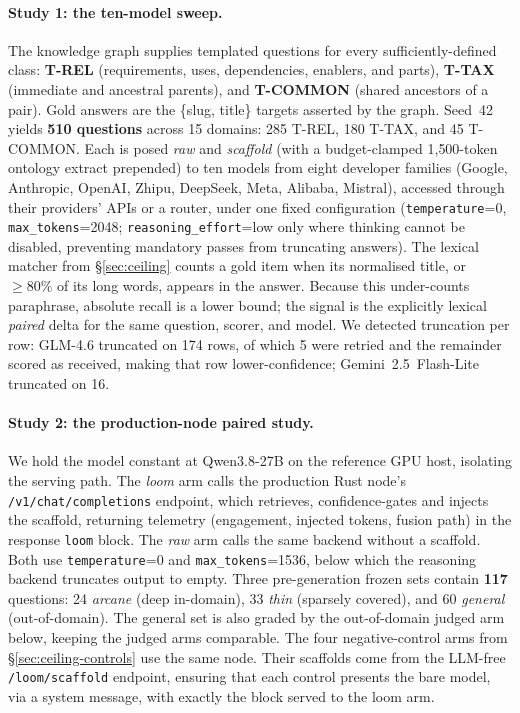 \documentclass[10pt,twocolumn]{article}
\begin{document}
\paragraph{Study 1: the ten-model sweep.} The knowledge graph supplies templated questions for every sufficiently-defined class: \textbf{T-REL} (requirements, uses, dependencies, enablers, and parts), \textbf{T-TAX} (immediate and ancestral parents), and \textbf{T-COMMON} (shared ancestors of a pair). Gold answers are the \{slug, title\} targets asserted by the graph. Seed~42 yields \textbf{510 questions} across 15 domains: 285 T-REL, 180 T-TAX, and 45 T-COMMON. Each is posed \emph{raw} and \emph{scaffold} (with a budget-clamped 1{,}500-token ontology extract prepended) to ten models from eight developer families (Google, Anthropic, OpenAI, Zhipu, DeepSeek, Meta, Alibaba, Mistral), accessed through their providers' APIs or a router, under one fixed configuration (\texttt{temperature}=0, \texttt{max\_tokens}=2048; \texttt{reasoning\_effort}=low only where thinking cannot be disabled, preventing mandatory passes from truncating answers). The lexical matcher from \S\ref{sec:ceiling} counts a gold item when its normalised title, or $\geq80\%$ of its long words, appears in the answer. Because this under-counts paraphrase, absolute recall is a lower bound; the signal is the explicitly lexical \emph{paired} delta for the same question, scorer, and model. We detected truncation per row: GLM-4.6 truncated on 174 rows, of which 5 were retried and the remainder scored as received, making that row lower-confidence; Gemini~2.5~Flash-Lite truncated on 16.

\paragraph{Study 2: the production-node paired study.} We hold the model constant at Qwen3.8-27B on the reference GPU host, isolating the serving path. The \emph{loom} arm calls the production Rust node's \texttt{/v1/chat/completions} endpoint, which retrieves, confidence-gates and injects the scaffold, returning telemetry (engagement, injected tokens, fusion path) in the response \texttt{loom} block. The \emph{raw} arm calls the same backend without a scaffold. Both use \texttt{temperature}=0 and \texttt{max\_tokens}=1536, below which the reasoning backend truncates output to empty. Three pre-generation frozen sets contain \textbf{117} questions: 24 \emph{arcane} (deep in-domain), 33 \emph{thin} (sparsely covered), and 60 \emph{general} (out-of-domain). The general set is also graded by the out-of-domain judged arm below, keeping the judged arms comparable. The four negative-control arms from \S\ref{sec:ceiling-controls} use the same node. Their scaffolds come from the LLM-free \texttt{/loom/scaffold} endpoint, ensuring that each control presents the bare model, via a system message, with exactly the block served to the loom arm.
\end{document}
